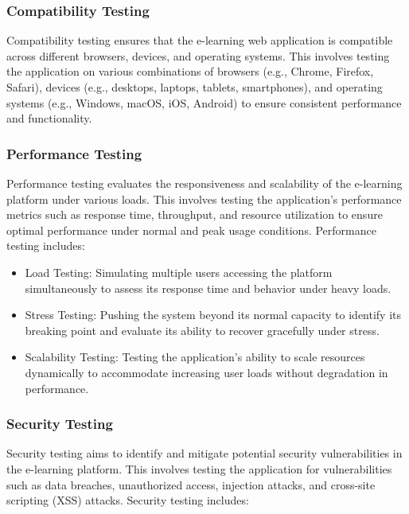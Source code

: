 		\subsubsection{Compatibility Testing}
		
		Compatibility testing ensures that the e-learning web application is compatible across different browsers, devices, and operating systems. This involves testing the application on various combinations of browsers (e.g., Chrome, Firefox, Safari), devices (e.g., desktops, laptops, tablets, smartphones), and operating systems (e.g., Windows, macOS, iOS, Android) to ensure consistent performance and functionality.
		
		\subsubsection{Performance Testing}
		
		Performance testing evaluates the responsiveness and scalability of the e-learning platform under various loads. This involves testing the application's performance metrics such as response time, throughput, and resource utilization to ensure optimal performance under normal and peak usage conditions. Performance testing includes:
		
		\begin{itemize}
			\item Load Testing: Simulating multiple users accessing the platform simultaneously to assess its response time and behavior under heavy loads.
			\item Stress Testing: Pushing the system beyond its normal capacity to identify its breaking point and evaluate its ability to recover gracefully under stress.
			\item Scalability Testing: Testing the application's ability to scale resources dynamically to accommodate increasing user loads without degradation in performance.
		\end{itemize}
		
		\subsubsection{Security Testing}
		
		Security testing aims to identify and mitigate potential security vulnerabilities in the e-learning platform. This involves testing the application for vulnerabilities such as data breaches, unauthorized access, injection attacks, and cross-site scripting (XSS) attacks. Security testing includes:
		
